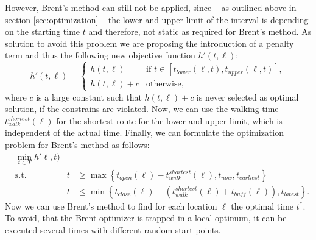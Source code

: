  However, Brent's method can still not be applied, since -- as outlined above in section \ref{sec:optimization} -- the lower and upper limit of the interval is depending on the starting time $t$ and therefore, not static as required for Brent's method. As solution to avoid this problem we are proposing the introduction of a penalty term and thus the following new objective function $h'(t,\ell)$:
 \begin{equation}
 \label{eq:optimal-time-penality}
 h'(t,\ell) = \begin{cases}
 h(t,\ell) & \text{if }t \in [t_{lower}(\ell, t), t_{upper}(\ell, t)],\\
 h(t,\ell)  + c & \text{otherwise,}
 \end{cases}
 \end{equation}
 where $c$ is a large constant such that $h(t,\ell) + c$ is never selected as optimal solution, if the constrains are violated. Now, we can use the walking time $t_{walk}^{shortest}(\ell)$  for the shortest route for the lower and upper limit, which is independent of the actual time. Finally, we can formulate the optimization problem for Brent's method as follows:
 \begin{subequations}
 	\label{eq:brent-optimization-problem}
 	\begin{alignat}{2}
 	&\min_{t \in T} h'\ell, t) && \\
 	&\text{s.t.} & t & \geq \max\left\lbrace  t_{open}(\ell)-t_{walk}^{shortest}(\ell), t_{now}, t_{earliest} \right\rbrace \\
 	& & t &\leq \min\left\lbrace  t_{close}(\ell)- \left(t_{walk}^{shortest}(\ell) + t_{buff}(\ell)\right), t_{latest} \right\rbrace.
 	\end{alignat}
 \end{subequations}
Now we can use Brent's method to find for each location $\ell$ the optimal time $t^*$. To avoid, that the Brent optimizer is trapped in a local optimum, it can be executed several times with different random start points.
